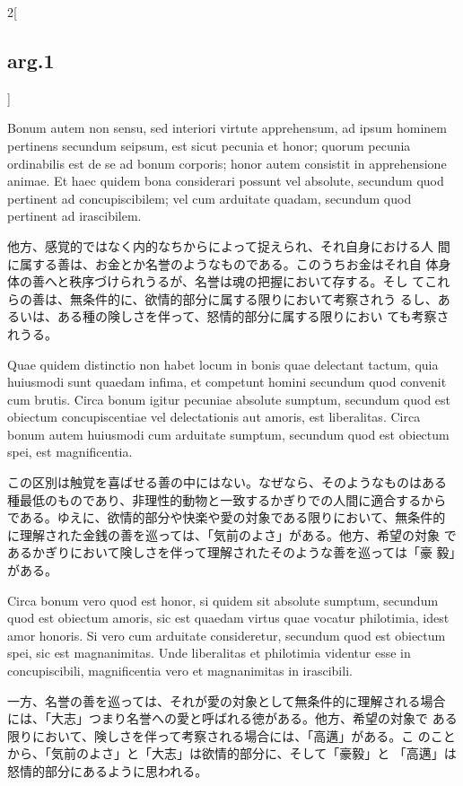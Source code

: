 \documentclass[paper=a4paper,fontsize=10pt,jafontsize=9pt,titlepage]{jlreq}
\begin{document}
\begin{paracol}{2}[\subsection{arg.1}]
\switchcolumn*

Bonum autem non sensu, sed interiori virtute apprehensum, ad ipsum
 hominem pertinens secundum seipsum, est sicut pecunia et honor;
 quorum pecunia ordinabilis est de se ad bonum corporis; honor autem
 consistit in apprehensione animae. Et haec quidem bona considerari
 possunt vel absolute, secundum quod pertinent ad concupiscibilem; vel
 cum arduitate quadam, secundum quod pertinent ad irascibilem.

\switchcolumn

他方、感覚的ではなく内的なちからによって捉えられ、それ自身における人
 間に属する善は、お金とか名誉のようなものである。このうちお金はそれ自
 体身体の善へと秩序づけられうるが、名誉は魂の把握において存する。そし
 てこれらの善は、無条件的に、欲情的部分に属する限りにおいて考察されう
 るし、あるいは、ある種の険しさを伴って、怒情的部分に属する限りにおい
 ても考察されうる。

\switchcolumn*

Quae quidem distinctio non habet locum in bonis quae delectant
 tactum, quia huiusmodi sunt quaedam infima, et competunt homini
 secundum quod convenit cum brutis. Circa bonum igitur pecuniae
 absolute sumptum, secundum quod est obiectum concupiscentiae vel
 delectationis aut amoris, est liberalitas. Circa bonum autem
 huiusmodi cum arduitate sumptum, secundum quod est obiectum spei, est
 magnificentia.

\switchcolumn

この区別は触覚を喜ばせる善の中にはない。なぜなら、そのようなものはある
種最低のものであり、非理性的動物と一致するかぎりでの人間に適合するから
である。ゆえに、欲情的部分や快楽や愛の対象である限りにおいて、無条件的
に理解された金銭の善を巡っては、「気前のよさ」がある。他方、希望の対象
であるかぎりにおいて険しさを伴って理解されたそのような善を巡っては「豪
毅」がある。

\switchcolumn*

Circa bonum vero quod est honor, si quidem sit absolute sumptum,
 secundum quod est obiectum amoris, sic est quaedam virtus quae
 vocatur philotimia, idest amor honoris. Si vero cum arduitate
 consideretur, secundum quod est obiectum spei, sic est
 magnanimitas. Unde liberalitas et philotimia videntur esse in
 concupiscibili, magnificentia vero et magnanimitas in irascibili.

\switchcolumn

一方、名誉の善を巡っては、それが愛の対象として無条件的に理解される場合
には、「大志」つまり名誉への愛と呼ばれる徳がある。他方、希望の対象で
ある限りにおいて、険しさを伴って考察される場合には、「高邁」がある。こ
のことから、「気前のよさ」と「大志」は欲情的部分に、そして「豪毅」と
「高邁」は怒情的部分にあるように思われる。


\end{paracol}
\end{document}
